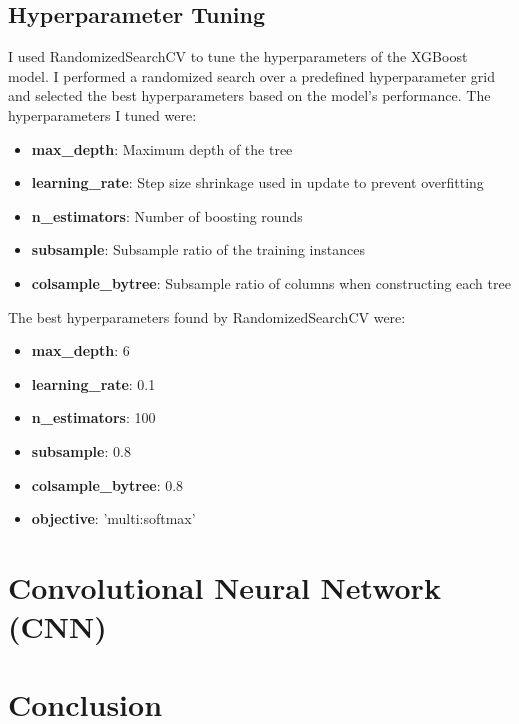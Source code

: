\documentclass[11.5pt]{article}
\begin{document}
\subsection{Hyperparameter Tuning}
I used RandomizedSearchCV to tune the hyperparameters of the XGBoost model. I performed a randomized search over a predefined hyperparameter grid and selected the best hyperparameters based on the model's performance. The hyperparameters I tuned were:
\begin{itemize}
    \item \textbf{max\_depth}: Maximum depth of the tree
    \item \textbf{learning\_rate}: Step size shrinkage used in update to prevent overfitting
    \item \textbf{n\_estimators}: Number of boosting rounds
    \item \textbf{subsample}: Subsample ratio of the training instances
    \item \textbf{colsample\_bytree}: Subsample ratio of columns when constructing each tree
\end{itemize}
The best hyperparameters found by RandomizedSearchCV were:
\begin{itemize}
    \item \textbf{max\_depth}: 6
    \item \textbf{learning\_rate}: 0.1
    \item \textbf{n\_estimators}: 100
    \item \textbf{subsample}: 0.8
    \item \textbf{colsample\_bytree}: 0.8
    \item \textbf{objective}: 'multi:softmax'
\end{itemize}

\section{Convolutional Neural Network (CNN)} \label{sec:cnn}
\section{Conclusion} \label{sec:conclusion}

\clearpage
\printbibliography[heading=bibintoc, title = {References}]
\end{document}
